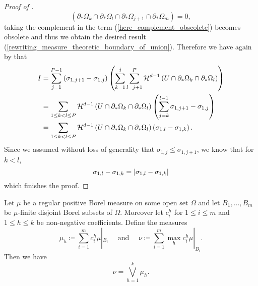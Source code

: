 \begin{proof}[Proof of ]
\begin{equation*}
		\left(
		\partial_{ \ast } \Omega_{ k }
		\cap
		\partial_{ \ast } \Omega_{ l } 
		\cap
		\partial_{ \ast } \Omega_{ j + 1 }
		\cap
		\partial_{ \ast } \Omega_{ m }
		\right) = 0,
	\end{equation*}
	taking the complement in the term (\ref{here_complement_obscolete}) becomes 
	obsolete and thus we obtain the desired result 
	(\ref{rewriting_measure_theoretic_boundary_of_union}).
	Therefore we have again by   that
	\begin{align*}
		I &=
		\sum_{ j = 1 }^{ P - 1 }
		\left(
		\sigma_{ 1 , j + 1 } - \sigma_{ 1 , j }
		\right)
		\left(
		\sum_{ k = 1 }^{ j }
		\sum_{ l = j + 1 }^{ P }
		\operatorname{\mathcal{H}}^{ d - 1 } \left( 
		U 
		\cap 
		\partial_{ \ast } \Omega_{ k } 
		\cap 
		\partial_{ \ast } \Omega_{ l }
		\right)
		\right)
		\\
		& =
		\sum_{ 1 \leq k < l \leq P }
		\operatorname{\mathcal{H}}^{ d - 1 } \left(
		U \cap \partial_{ \ast } \Omega_{ k }
		\cap
		\partial_{ \ast } \Omega_{ l }
		\right)
		\left(
		\sum_{ j = k }^{ l - 1 }
		\sigma_{ 1 , j + 1 } - \sigma_{ 1 , j }
		\right)
		\\
		& =
		\sum_{ 1 \leq k < l \leq P }
		\operatorname{\mathcal{H}}^{ d - 1 } \left(
		U \cap 
		\partial_{ \ast } \Omega_{ k }
		\cap
		\partial_{ \ast } \Omega_{ l }
		\right)
		\left(
		\sigma_{ 1, l } - \sigma_{ 1 , k }
		\right).
	\end{align*}
	Since we assumed without loss of generality that $ \sigma_{ 1 , j } \leq 
	\sigma_{ 1, j + 1 } $, we know that
	for $ k < l $,
	\begin{equation*}
		\sigma_{ 1 , l } - \sigma_{ 1 , k }
		=
		\abs{ \sigma_{ 1 , l } - \sigma_{ 1 , k } }
	\end{equation*}
	which finishes the proof.
\end{proof}

\begin{lemma}
	\label{supremum_of_measures_lemma}
	Let $ \mu $ be a regular positive Borel measure on some open set $ \Omega $ and let $ B_{ 1 }, \dotsc, B_{ m } $ be $ \mu $-finite disjoint Borel subsets of $ \Omega $. Moreover let $ c_{ i }^{ h } $ for $ 1 \leq i \leq m $ and $ 1 \leq h \leq k $ be non-negative coefficients. Define the measures
	\begin{equation*}
		\mu_{ h } 
		\coloneqq
		\sum_{ i = 1 }^{ m }
		c_{ i }^{ h }
		\mu |_{ B_{ i } }
		\quad
		\text{ and }
		\quad 
		\nu 
		\coloneqq
		\sum_{ i = 1 }^{ m }
		\max_{ h } c_{ i }^{ h }
		\mu |_{ B_{ i } }.
	\end{equation*}
	Then we have
	\begin{equation*}
		\nu 
		=
		\bigvee_{ h = 1 }^{ k }
		\mu_{ h }.
	\end{equation*}
\end{lemma}

